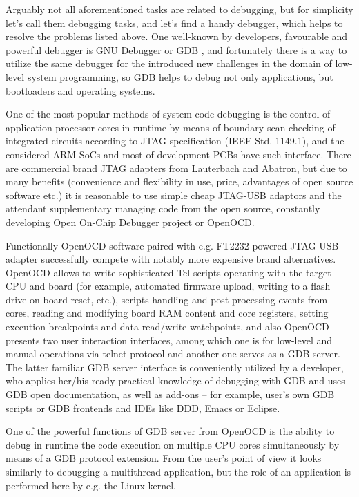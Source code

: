 \documentclass[10pt, a5paper]{article}
\begin{document}
Arguably not all aforementioned tasks are related to debugging, but for simplicity let's call them debugging tasks, and let's find a handy debugger, which helps to resolve the problems listed above. One well-known by developers, favourable and powerful debugger is GNU Debugger or GDB \cite{Zapolskiy1}, and fortunately there is a way to utilize the same debugger for the introduced new challenges in the domain of low-level system programming, so GDB helps to debug not only applications, but bootloaders and operating systems.

One of the most popular methods of system code debugging is the control of application processor cores in runtime by means of boundary scan checking of integrated circuits according to JTAG specification (IEEE Std. 1149.1)\cite{Zapolskiy2}, and the considered ARM SoCs and most of development PCBs have such interface. There are commercial brand JTAG adapters from Lauterbach and Abatron, but due to many benefits (convenience and flexibility in use, price, advantages of open source software etc.) it is reasonable to use simple cheap JTAG-USB adaptors and the attendant supplementary managing code from the open source, constantly developing Open On-Chip Debugger project or OpenOCD\cite{Zapolskiy3}.

Functionally OpenOCD software paired with e.g. FT2232 powered JTAG-USB adapter successfully compete with notably more expensive brand alternatives. OpenOCD allows to write sophisticated Tcl scripts operating with the target CPU and board (for example, automated firmware upload, writing to a flash drive on board reset, etc.), scripts handling and post-processing events from cores, reading and modifying board RAM content and core registers, setting execution breakpoints and data read/write watchpoints, and also OpenOCD presents two user interaction interfaces, among which one is for low-level and manual operations via telnet protocol and another one serves as a GDB server. The latter familiar GDB server interface is conveniently utilized by a developer, who applies her/his ready practical knowledge of debugging with GDB and uses GDB open documentation, as well as add-ons -- for example, user's own GDB scripts or GDB frontends and IDEs like DDD, Emacs or Eclipse.

One of the powerful functions of GDB server from OpenOCD is the ability to debug in runtime the code execution on multiple CPU cores simultaneously by means of a GDB protocol extension. From the user's point of view it looks similarly to debugging a multithread application, but the role of an application is performed here by e.g. the Linux kernel.
\end{document}
